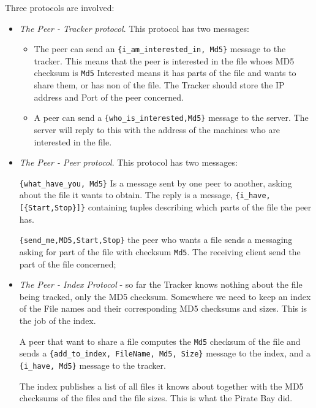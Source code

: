 \documentclass[12pt]{hitec}
\begin{document}
Three protocols are involved:

\begin{itemize}
  
\item {\sl The Peer - Tracker protocol}. This protocol has two messages:
  \begin{itemize}

  \item
    The peer can send an \verb+{i_am_interested_in, Md5}+ message to
    the tracker.  This means that the peer is interested in the file
    whoes MD5 checksum is \verb+Md5+ Interested means it has parts of
    the file and wants to share them, or has non of the file.  The
    Tracker should store the IP address and Port of the peer
    concerned.

  \item A peer can send a \verb+{who_is_interested,Md5}+ message to the
    server. The server will reply to this with the address of the
    machines who are interested in the file.

  \end{itemize}

\item {\sl The Peer - Peer protocol}. This protocol has two messages:

  \verb+{what_have_you, Md5}+ Is a message sent by one peer to another, asking
  about the file it wants to obtain. The reply is a message,
  \verb+{i_have,[{Start,Stop}]}+ containing tuples
  describing which parts of the file the peer has.
  
  \verb+{send_me,MD5,Start,Stop}+ the peer who wants a file sends a
  messaging asking for part of the file with checksum \verb+Md5+.
  The receiving client send the part of the file concerned;

\item {\sl The Peer - Index Protocol} - so far the Tracker knows
  nothing about the file being tracked, only the MD5
  checksum. Somewhere we need to keep an index of the File names and
  their corresponding MD5 checksums and sizes. This is the job of the
  index.

  A peer that want to share a file computes the \verb+Md5+ checksum of the file
  and sends a \verb+{add_to_index, FileName, Md5, Size}+ message to the index,
  and a \verb+{i_have, Md5}+ message to the tracker.

  The index publishes a list of all files it knows about together with the
  MD5 checksums of the files and the file sizes. This is what the Pirate Bay did.
  
\end{itemize}
\end{document}
